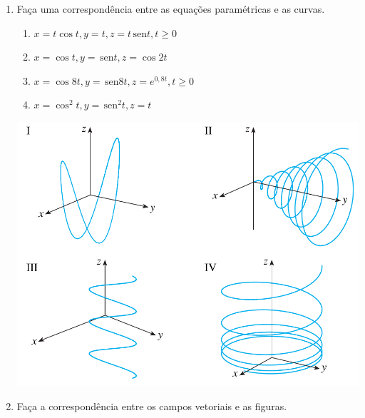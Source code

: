 \documentclass[a4paper,5pt]{amsbook}
\newcommand{\sen}{\,\mbox{sen}}
\begin{document}
\vspace{1cm}
\begin{enumerate}
    \setlength\itemsep{0.5cm}
    \item Fa\c{c}a uma correspond\^encia entre as equa\c{c}\~oes param\'etricas e as curvas.

    \hspace{-1.5cm}
    \begin{minipage}[l]{0.5\textwidth}
        \begin{enumerate}
            \setlength\itemsep{0.2cm}
            \item $x=t\cos{t}, y=t, z=t\sen{t}, t\ge 0$
            \item $x=\cos{t}, y=\sen{t}, z=\cos{2t}$
            \item $x=\cos{8t}, y=\sen{8t}, z=e^{0,8t}, t\ge 0$
            \item $x=\cos^2{t}, y=\sen^2{t}, z=t$
        \end{enumerate}
    \end{minipage}
    \begin{minipage}[l]{0.5\textwidth}
        \includegraphics[width=\textwidth]{lista-11-fig2.png}
    \end{minipage}

    \item Fa\c{c}a a correspond\^encia entre os campos vetoriais e as figuras.


\end{enumerate}
\end{document}
